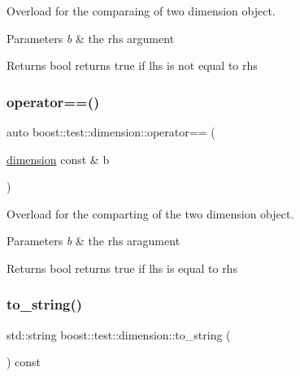 Overload for the comparaing of two dimension object. 


\begin{DoxyParams}{Parameters}
{\em b} & the rhs argument \\
\hline
\end{DoxyParams}
\begin{DoxyReturn}{Returns}
bool returns true if lhs is not equal to rhs 
\end{DoxyReturn}
\mbox{\label{structboost_1_1test_1_1dimension_ad780c612257d89320f485ee3708620cc}} 
\subsubsection{\texorpdfstring{operator==()}{operator==()}}
{\footnotesize\ttfamily auto boost\+::test\+::dimension\+::operator== (\begin{DoxyParamCaption}\item[{\mbox{\hyperlink{structboost_1_1test_1_1dimension}{dimension}} const \&}]{b }\end{DoxyParamCaption})\hspace{0.3cm}{\ttfamily [inline]}}



Overload for the comparting of the two dimension object. 


\begin{DoxyParams}{Parameters}
{\em b} & the rhs aragument \\
\hline
\end{DoxyParams}
\begin{DoxyReturn}{Returns}
bool returns true if lhs is equal to rhs 
\end{DoxyReturn}
\mbox{\label{structboost_1_1test_1_1dimension_a0ab6b006f11c653d8a4221a1523714a6}} 
\subsubsection{\texorpdfstring{to\_string()}{to\_string()}}
{\footnotesize\ttfamily std\+::string boost\+::test\+::dimension\+::to\+\_\+string (\begin{DoxyParamCaption}{ }\end{DoxyParamCaption}) const\hspace{0.3cm}{\ttfamily [inline]}}



